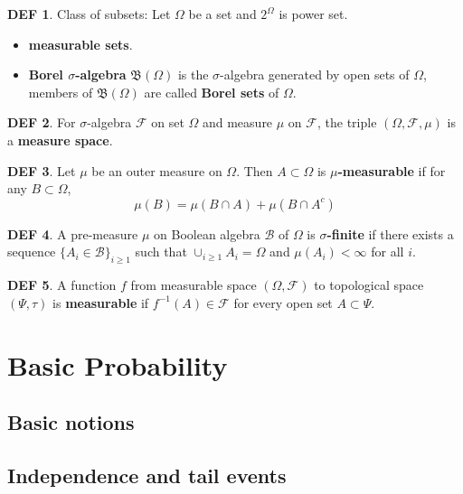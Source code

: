 \documentclass[hidelinks,11pt]{article}
\theoremstyle{definition}
\newtheorem*{defin}{DEF}
\theoremstyle{dotless}
\theoremstyle{remark}
\DeclareMathOperator{\1}{\mathbf{1}}
\begin{document}
\begin{defin}
Class of subsets: Let $\Omega$ be a set and $2^\Omega$ is power set.\begin{itemize}
    \item \textbf{measurable sets}.
    \item \textbf{Borel $\sigma$-algebra} $\mathfrak{B}(\Omega)$ is the $\sigma$-algebra generated by open sets of $\Omega$, members of $\mathfrak{B}(\Omega)$ are called \textbf{Borel sets} of $\Omega$.
\end{itemize}
\end{defin}

\begin{defin}
For $\sigma$-algebra $\mathcal{F}$ on set $\Omega$ and measure $\mu$ on $\mathcal{F}$, the triple $(\Omega,\mathcal{F},\mu)$ is a \textbf{measure space}.
\end{defin}

\begin{defin}
Let $\mu$ be an outer measure on $\Omega$. Then $A\subset\Omega$ is \textbf{$\mu$-measurable} if for any $B\subset\Omega$,
\[\mu(B)=\mu(B\cap A)+\mu(B\cap A^c)\]
\end{defin}

\begin{defin}
A pre-measure $\mu$ on Boolean algebra $\mathcal{B}$ of $\Omega$ is \textbf{$\sigma$-finite} if there exists a sequence $\{A_i\in\mathcal{B}\}_{i\geq1}$ such that $\cup_{i\geq1}A_i=\Omega$ and $\mu(A_i)<\infty$ for all $i$.
\end{defin}

\begin{defin}
A function $f$ from measurable space $(\Omega,\mathcal{F})$ to topological space $(\Psi,\tau)$ is \textbf{measurable} if $f^{-1}(A)\in\mathcal{F}$ for every open set $A\subset\Psi$.
\end{defin}

\section{Basic Probability}

\subsection{Basic notions}

\subsection{Independence and tail events}
\end{document}
